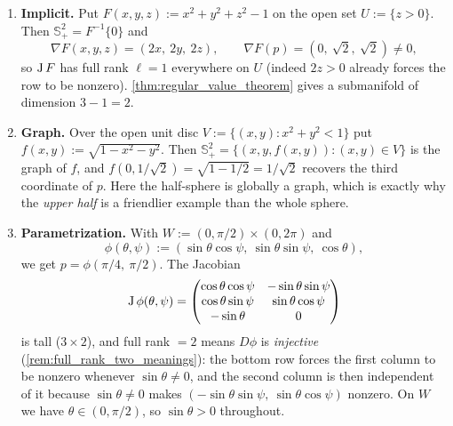 \begin{example}
\label{ex:half_sphere_three_ways}
\begin{enumerate}[label=\textbf{(\alph*)}]
  \item \textbf{Implicit.} Put $F(x,y,z) := x^2+y^2+z^2-1$ on the open set
    $U := \{z>0\}$. Then $\mathbb{S}^2_+ = F^{-1}\{0\}$ and
    \[\nabla F(x,y,z) = (2x,\ 2y,\ 2z), \qquad \nabla F(p) = (0,\ \sqrt2,\ \sqrt2) \neq 0,\]
    so $\operatorname{J} F$ has full rank $\ell = 1$ everywhere on $U$ (indeed $2z > 0$ already forces the
    row to be nonzero). \cref{thm:regular_value_theorem} gives a submanifold of dimension
    $3-1 = 2$.
  \item \textbf{Graph.} Over the open unit disc $V := \{(x,y) : x^2+y^2 < 1\}$ put
    $f(x,y) := \sqrt{1-x^2-y^2}$. Then $\mathbb{S}^2_+ = \{(x,y,f(x,y)) : (x,y) \in V\}$ is the
    graph of $f$, and $f(0,1/\sqrt2) = \sqrt{1-1/2} = 1/\sqrt2$ recovers the third coordinate of
    $p$. Here the half-sphere is globally a graph, which is exactly why the \emph{upper half} is
    a friendlier example than the whole sphere.
  \item \textbf{Parametrization.} With $W := (0,\pi/2) \times (0,2\pi)$ and
    \[\phi(\theta,\psi) := (\sin\theta\cos\psi,\ \sin\theta\sin\psi,\ \cos\theta),\]
    we get $p = \phi(\pi/4,\ \pi/2)$. The Jacobian
    \[\operatorname{J}\phi(\theta,\psi) = \begin{pmatrix}
        \cos\theta\cos\psi & -\sin\theta\sin\psi \\
        \cos\theta\sin\psi & \sin\theta\cos\psi \\
        -\sin\theta & 0
      \end{pmatrix}\]
    is tall ($3\times2$), and full rank $=2$ means $D\phi$ is \emph{injective}
    (\cref{rem:full_rank_two_meanings}): the bottom row forces the first column to be nonzero
    whenever $\sin\theta \neq 0$, and the second column is then independent of it because
    $\sin\theta \neq 0$ makes $(-\sin\theta\sin\psi,\ \sin\theta\cos\psi)$ nonzero. On $W$ we
    have $\theta \in (0,\pi/2)$, so $\sin\theta > 0$ throughout.
\end{enumerate}
\end{example}

